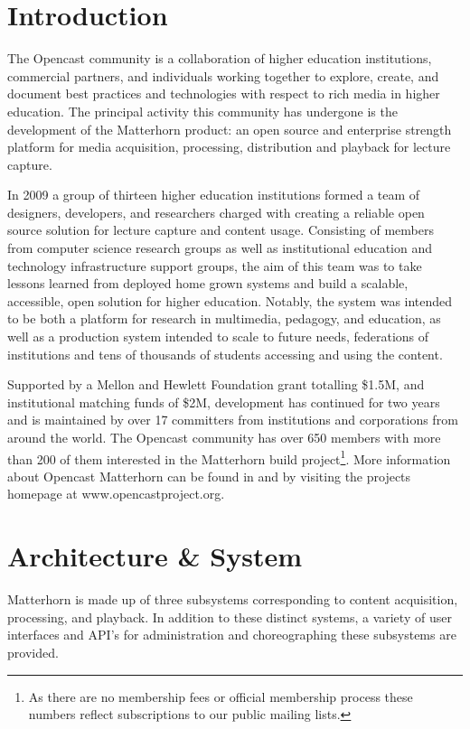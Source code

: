 \documentclass{sig-alternate}
\begin{document}
\section{Introduction}
The Opencast community is a collaboration of higher education institutions, commercial partners, and individuals working together to explore, create, and document best practices and technologies with respect to rich media in higher education.  The principal activity this community has undergone is the development of the Matterhorn product: an open source and enterprise strength platform for media acquisition, processing, distribution and playback for lecture capture.

In 2009 a group of thirteen higher education institutions formed a team of designers, developers, and researchers charged with creating a reliable open source solution for lecture capture and content usage.  Consisting of members from computer science research groups as well as institutional education and technology infrastructure support groups, the aim of this team was to take lessons learned from deployed home grown systems and build a scalable, accessible, open solution for higher education.  Notably, the system was intended to be both a platform for research in multimedia, pedagogy, and education, as well as a production system intended to scale to future needs, federations of institutions and tens of thousands of students accessing and using the content.

Supported by a Mellon and Hewlett Foundation grant totalling \$1.5M, and institutional matching funds of \$2M, development has continued for two years and is maintained by over 17 committers from institutions and corporations from around the world.  The Opencast community has over 650 members with more than 200 of them interested in the Matterhorn build project\footnote{As there are no membership fees or official membership process these numbers reflect subscriptions to our public mailing lists.}. More information about Opencast Matterhorn can be found in \cite{DBLP:journals/itse/KetterlSH10} and by visiting the projects homepage at www.opencastproject.org. 

\section{Architecture \& System}
Matterhorn is made up of three subsystems corresponding to content acquisition, processing, and playback.  In addition to these distinct systems, a variety of user interfaces and API's for administration and choreographing these subsystems are provided.  
\end{document}
